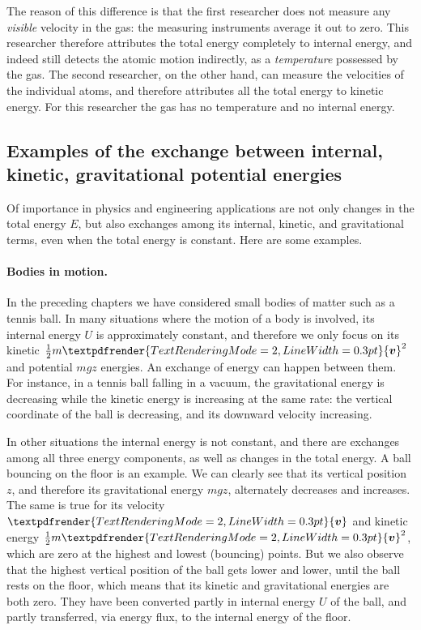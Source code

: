 \documentclass[a4paper,12pt,%
onecolumn,oneside,titlepage,%
british%
]{memoir}
\renewcommand*{\bm}[1]{\textpdfrender{TextRenderingMode=2,LineWidth=0.3pt}{\boldsymbol{#1}}}
\renewcommand*{\|}[1][]{\nonscript\:#1\vert\nonscript\:\mathopen{}}
\newcommand*{\yv}{\bm{v}}
\newcommand*{\yM}{m}%
\newcommand*{\yE}{E}
\newcommand*{\yU}{U}
\begin{document}
The reason of this difference is that the first researcher does not measure any \emph{visible} velocity in the gas: the measuring instruments average it out to zero. This researcher therefore attributes the total energy completely to internal energy, and indeed still detects the atomic motion indirectly, as a \emph{temperature} possessed by the gas. The second researcher, on the other hand, can measure the velocities of the individual atoms, and therefore attributes all the total energy to kinetic energy. For this researcher the gas has no temperature and no internal energy.


\subsection{Examples of the exchange between internal, kinetic, gravitational potential energies}
\label{sec:energy_constitutive_content}

Of importance in physics and engineering applications are not only changes in the total energy $\yE$, but also exchanges among its internal, kinetic, and gravitational terms, even when the total energy is constant. Here are some examples.

\paragraph{Bodies in motion.}

In the preceding chapters we have considered small bodies of matter such as a tennis ball. In many situations where the motion of a body is involved, its internal energy $\yU$ is approximately constant, and therefore we only focus on its kinetic $\tfrac{1}{2}\yM \yv^{2}$ and potential $\yM g z$ energies. An exchange of energy can happen between them. For instance, in a tennis ball falling in a vacuum, the gravitational energy is decreasing while the kinetic energy is increasing at the same rate: the vertical coordinate of the ball is decreasing, and its downward velocity increasing.

In other situations the internal energy is not constant, and there are exchanges among all three energy components, as well as changes in the total energy. A ball bouncing on the floor is an example. We can clearly see that its vertical position $z$, and therefore its gravitational energy $\yM g z$, alternately decreases and increases. The same is true for its velocity $\yv$ and kinetic energy $\tfrac{1}{2}\yM \yv^{2}$, which are zero at the highest and lowest (bouncing) points. But we also observe that the highest vertical position of the ball gets lower and lower, until the ball rests on the floor, which means that its kinetic and gravitational energies are both zero. They have been converted partly in internal energy $\yU$ of the ball, and partly transferred, via energy flux, to the internal energy of the floor.
\end{document}
